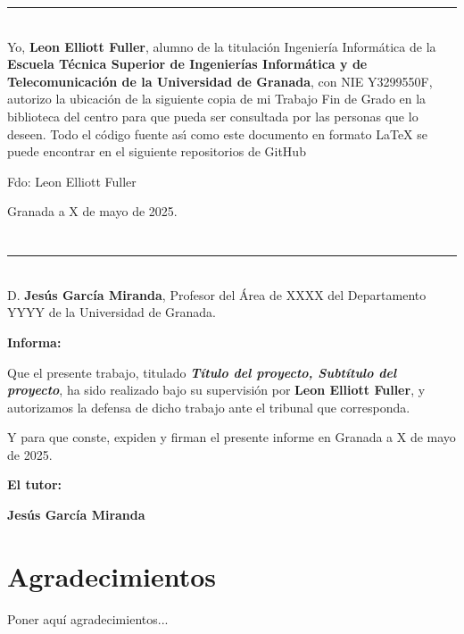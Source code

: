 \noindent\rule[-1ex]{\textwidth}{2pt}\\[4.5ex]

Yo, \textbf{Leon Elliott Fuller}, alumno de la titulación Ingeniería Informática de la \textbf{Escuela Técnica Superior
de Ingenierías Informática y de Telecomunicación de la Universidad de Granada}, con NIE Y3299550F, autorizo la
ubicación de la siguiente copia de mi Trabajo Fin de Grado en la biblioteca del centro para que pueda ser
consultada por las personas que lo deseen. Todo el código
fuente ası́ como este documento en formato LaTeX se puede encontrar en
el siguiente repositorios de GitHub

\vspace{6cm}

\noindent Fdo: Leon Elliott Fuller

\vspace{2cm}

\begin{flushright}
Granada a X de mayo de 2025.
\end{flushright}


\chapter*{}
\thispagestyle{empty}

\noindent\rule[-1ex]{\textwidth}{2pt}\\[4.5ex]

D. \textbf{Jesús García Miranda}, Profesor del Área de XXXX del Departamento YYYY de la Universidad de Granada.

\vspace{0.5cm}

\vspace{0.5cm}

\textbf{Informa:}

\vspace{0.5cm}

Que el presente trabajo, titulado \textit{\textbf{Título del proyecto, Subtítulo del proyecto}},
ha sido realizado bajo su supervisión por \textbf{Leon Elliott Fuller}, y autorizamos la defensa de dicho trabajo ante el tribunal
que corresponda.

\vspace{0.5cm}

Y para que conste, expiden y firman el presente informe en Granada a X de mayo de 2025.

\vspace{1cm}

\textbf{El tutor:}

\vspace{5cm}

\noindent \textbf{Jesús García Miranda}

\chapter*{Agradecimientos}
\thispagestyle{empty}

       \vspace{1cm}


Poner aquí agradecimientos...

